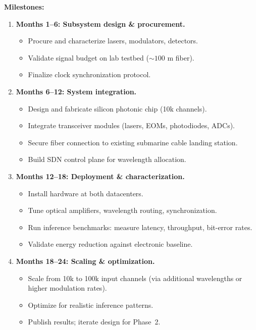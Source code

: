 \documentclass[12pt]{article}
\begin{document}
\textbf{Milestones:}
\begin{enumerate}[leftmargin=1.6em,itemsep=2pt]
  \item \textbf{Months 1--6: Subsystem design \& procurement.}
    \begin{itemize}[leftmargin=1.2em,itemsep=1pt]
      \item Procure and characterize lasers, modulators, detectors.
      \item Validate signal budget on lab testbed (\(\sim\!100\) m fiber).
      \item Finalize clock synchronization protocol.
    \end{itemize}
  
  \item \textbf{Months 6--12: System integration.}
    \begin{itemize}[leftmargin=1.2em,itemsep=1pt]
      \item Design and fabricate silicon photonic chip (10k channels).
      \item Integrate transceiver modules (lasers, EOMs, photodiodes, ADCs).
      \item Secure fiber connection to existing submarine cable landing station.
      \item Build SDN control plane for wavelength allocation.
    \end{itemize}
  
  \item \textbf{Months 12--18: Deployment \& characterization.}
    \begin{itemize}[leftmargin=1.2em,itemsep=1pt]
      \item Install hardware at both datacenters.
      \item Tune optical amplifiers, wavelength routing, synchronization.
      \item Run inference benchmarks: measure latency, throughput, bit-error rates.
      \item Validate energy reduction against electronic baseline.
    \end{itemize}
  
  \item \textbf{Months 18--24: Scaling \& optimization.}
    \begin{itemize}[leftmargin=1.2em,itemsep=1pt]
      \item Scale from 10k to 100k input channels (via additional wavelengths or higher
      modulation rates).
      \item Optimize for realistic inference patterns.
      \item Publish results; iterate design for Phase~2.
    \end{itemize}
\end{enumerate}
\end{document}

